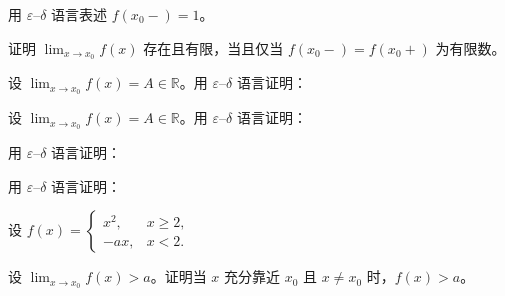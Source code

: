 \newpage
\noindent\begin{minipage}{\textwidth}
用 $\varepsilon$--$\delta$ 语言表述 $f(x_0-)=1$。
\end{minipage}\par\vfill
\noindent\begin{minipage}{\textwidth}
证明 $\lim_{x\to x_0}f(x)$ 存在且有限，当且仅当 $f(x_0-)=f(x_0+)$ 为有限数。
\end{minipage}\par\vfill
\noindent\begin{minipage}{\textwidth}
设 $\lim_{x\to x_0}f(x)=A\in\mathbb R$。用 $\varepsilon$--$\delta$ 语言证明：
\end{minipage}\par\vfill
\newpage
\noindent\begin{minipage}{\textwidth}
设 $\lim_{x\to x_0}f(x)=A\in\mathbb R$。用 $\varepsilon$--$\delta$ 语言证明：
\end{minipage}\par\vfill
\noindent\begin{minipage}{\textwidth}
用 $\varepsilon$--$\delta$ 语言证明：
\end{minipage}\par\vfill
\noindent\begin{minipage}{\textwidth}
用 $\varepsilon$--$\delta$ 语言证明：
\end{minipage}\par\vfill
\newpage
\noindent\begin{minipage}{\textwidth}
设 $f(x)=\begin{cases}x^2,&x\ge2,\\-ax,&x<2.\end{cases}$
\end{minipage}\par\vfill
\noindent\begin{minipage}{\textwidth}
设 $\lim_{x\to x_0}f(x)>a$。证明当 $x$ 充分靠近 $x_0$ 且 $x\ne x_0$ 时，$f(x)>a$。
\end{minipage}\par\vfill
